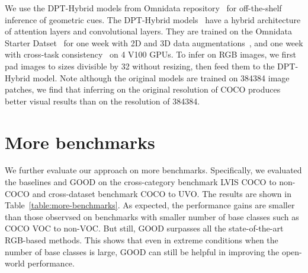 \documentclass{article} \usepackage{iclr2023_conference,times}
\begin{document}
We use the DPT-Hybrid models from Omnidata repository~\citep{eftekhar2021omnidata} for off-the-shelf inference of geometric cues. The DPT-Hybrid models~\citep{Ranftl2021} have a hybrid architecture of attention layers and convolutional layers. They are trained on the Omnidata Starter Datset~\citep{eftekhar2021omnidata} for one week with 2D and 3D data augmentations~\citep{kar20223d}, and one week with cross-task consistency~\citep{zamir2020robust} on 4 V100 GPUs. To infer on RGB images, we first pad images to sizes divisible by 32 without resizing, then feed them to the DPT-Hybrid model. Note although the original models are trained on 384384 image patches, we find that inferring on the original resolution of COCO produces better visual results than on the resolution of 384384.


\section{More benchmarks}
We further evaluate our approach on more benchmarks. Specifically, we evaluated the baselines and GOOD on the cross-category benchmark LVIS COCO to non-COCO and cross-dataset benchmark COCO to UVO. The results are shown in Table~\ref{table:more-benchmarks}. As expected, the performance gains are smaller than those observsed on benchmarks with smaller number of base classes such as COCO VOC to non-VOC. But still, GOOD surpasses all the state-of-the-art RGB-based methods. This shows that even in extreme conditions when the number of base classes is large, GOOD can still be helpful in improving the open-world performance.
\end{document}
